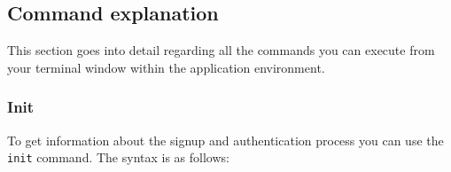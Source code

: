 \subsection{Command explanation}\label{commands}
This section goes into detail regarding all the commands you can execute from your terminal window within the application environment.

\subsubsection{Init}
To get information about the signup and authentication process you can use the \texttt{init} command. The syntax is as follows:
\begin{center}
\end{center}

